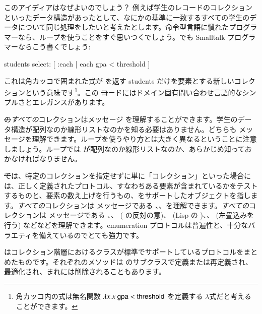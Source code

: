 \documentclass[a4paper,10pt,twoside]{book}
\begin{document}
このアイディアはなぜよいのでしょう？
例えば学生のレコードのコレクションといったデータ構造があったとして、なにかの基準に一致するすべての学生のデータについて同じ処理をしたいと考えたとします。命令型言語に慣れたプログラマーなら、ループを使うことをすぐ思いつくでしょう。でも Smalltalk プログラマーならこう書くでしょう:
\begin{code}{}
students select: [ :each | each gpa < threshold ]
\end{code}
\noindent
これは角カッコで囲まれた式が  を返す students だけを要素とする新しいコレクションという意味です\footnote{角カッコ内の式は無名関数 $\lambda x. x~{\sf gpa} < {\sf threshold}$ を定義する $\lambda$式だと考えることができます。}。この \st コードにはドメイン固有問い合わせ言語的なシンプルさとエレガンスがあります。

\st の\emph{すべての}コレクションはメッセージ  を理解することができます。学生のデータ構造が配列なのか線形リストなのかを知る必要はありません。どちらも  メッセージを理解できます。ループを使うやり方とは大きく異なるということに注意しましょう。ループでは  が配列なのか線形リストなのか、あらかじめ知っておかなければなりません。

\st では、特定のコレクションを指定せずに単に「コレクション」といった場合には、正しく定義されたプロトコル、すなわちある要素が含まれているかをテストするものと、要素の数え上げを行うもの、をサポートしたオブジェクトを指します。\emph{すべての}コレクションは  メッセージである \mbox{、}\mbox{、}を理解できます。\emph{すべての}コレクションは  メッセージである 、、 ( の反対の意)、 (Lisp の )、、 (左畳込みを行う) などなどを理解できます。emumeration プロトコルは普遍性と、十分なバラエティを備えているのでとても強力です。

 はコレクション階層におけるクラスが標準でサポートしているプロトコルをまとめたものです。それぞれのメソッドは  のサブクラスで定義または再定義され、最適化され、まれには削除されることもあります。
\end{document}
